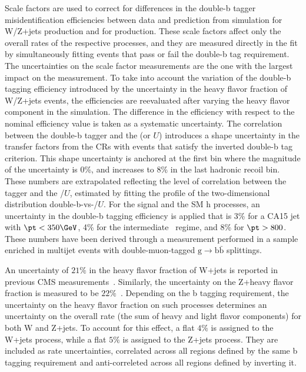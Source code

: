 Scale factors are used to correct for differences in the double-b tagger misidentification efficiencies between data and prediction from simulation for W/Z+jets production and for \ttbar production. These scale factors affect only the overall rates of the respective processes, and they are measured directly in the fit by simultaneously fitting events that pass or fail the double-b tag requirement. The uncertainties on the scale factor measurements are the one with the largest impact on the measurement. To take into account the variation of the double-b tagging efficiency
introduced by the uncertainty in the heavy flavor fraction of W/Z+jets
events, the efficiencies are reevaluated after varying the heavy
flavor component in the simulation. The difference in the efficiency with respect to the nominal efficiency value is taken as a systematic uncertainty.
The correlation between the double-b tagger and the \ptmiss (or $U$) introduces a shape uncertainty in the transfer factors from the CRs with events that satisfy the inverted double-b tag criterion. This shape uncertainty is anchored at the first bin where the magnitude of the uncertainty is 0\%, and increases to 8\% in the last hadronic recoil bin. These numbers are extrapolated reflecting the level of correlation between the tagger and the \ptmiss/$U$, estimated by fitting the profile of the two-dimensional distribution double-b-vs-\ptmiss/$U$.
For the signal and the SM h processes, an uncertainty in the double-b tagging efficiency is applied that is 3\% for a CA15 jet with $\pt<350\GeV$, 4\% for the intermediate \pt~regime, and 8\% for $\pt>800$\GeV. These numbers have been derived through a measurement performed in a sample enriched in multijet events with double-muon-tagged $\text{g}\to\text{b}\bar{\text{b}}$ splittings. 

An uncertainty of $21\%$ in the heavy flavor fraction of
W+jets is reported in previous CMS measurements~\cite{Khachatryan:2014uva,Chatrchyan:2013uza}. Similarly, the uncertainty on the Z+heavy flavor fraction is measured to be $22\%$~\cite{Khachatryan:2014zya,Chatrchyan:2014dha}. Depending on the b tagging requirement, the uncertainty on the heavy flavor fraction on such processes determines an uncertainty on the overall rate (the sum of heavy and light flavor components) for both W and Z+jets. To account for this effect, a flat $4\%$ is assigned to the W+jets process, while a flat $5\%$ is assigned to the Z+jets process. They are included as rate uncertainties, correlated across all regions defined by the same b tagging requirement and anti-correleted across all regions defined by inverting it.

